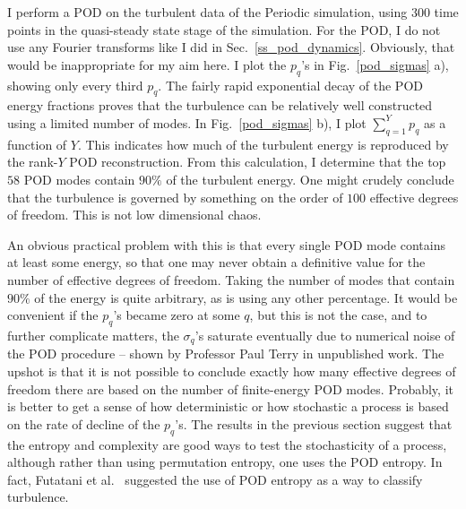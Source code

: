 I perform a POD on the turbulent data of the Periodic simulation, using $300$ time points in the quasi-steady state stage of the simulation. 
For the POD, I do not use any Fourier transforms like I did in Sec.~\ref{ss_pod_dynamics}. Obviously, that would be inappropriate for my aim here.
I plot the $p_q$'s in Fig.~\ref{pod_sigmas} a), showing only every third $p_q$. 
The fairly rapid exponential decay of the POD energy fractions proves that the turbulence can be relatively well constructed
using a limited number of modes. In Fig.~\ref{pod_sigmas} b), I plot $\sum_{q=1}^Y p_q$ as a function of $Y$. This indicates how much of the turbulent energy is reproduced by the rank-$Y$ POD
reconstruction. From this calculation, I determine that the top $58$ POD modes contain $90\%$ of the turbulent energy. One might crudely conclude that the turbulence is governed by something
on the order of $100$ effective degrees of freedom. This is not low dimensional chaos.

An obvious practical problem with this is that every single POD mode contains at least some energy, so that one may never obtain a definitive value for the number of effective degrees of freedom. 
Taking the number of modes that contain $90\%$ of the energy is quite arbitrary, as is using any other percentage. It would be convenient if the $p_q$'s became zero at some $q$, but this is not
the case, and to further complicate matters, the $\sigma_q$'s saturate eventually due to numerical noise of the POD procedure -- shown by Professor Paul Terry in unpublished work. The upshot
is that it is not possible to conclude exactly how many effective degrees of freedom there are based on the number of finite-energy POD modes. Probably, it is better to get a sense of how
deterministic or how stochastic a process is based on the rate of decline of the $p_q$'s. The results in the previous section suggest that the entropy and complexity are good ways
to test the stochasticity of a process, although rather than using permutation entropy, one uses the POD entropy. In fact, Futatani et al.~\cite{futatani2009} suggested the use of POD entropy as a way
to classify turbulence.

